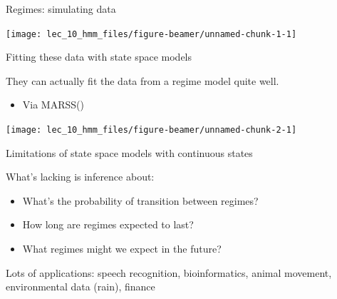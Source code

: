 \documentclass[
  ignorenonframetext,
]{beamer}
\providecommand{\tightlist}{%
  \setlength{\itemsep}{0pt}\setlength{\parskip}{0pt}}
\begin{document}
\begin{frame}{Regimes: simulating data}
\protect\hypertarget{regimes-simulating-data}{}

\begin{center}\texttt{[image: lec\_10\_hmm\_files/figure-beamer/unnamed-chunk-1-1]} \end{center}

\end{frame}

\begin{frame}{Fitting these data with state space models}
\protect\hypertarget{fitting-these-data-with-state-space-models}{}

They can actually fit the data from a regime model quite well.

\begin{itemize}
\tightlist
\item
  Via MARSS()
\end{itemize}

\begin{center}\texttt{[image: lec\_10\_hmm\_files/figure-beamer/unnamed-chunk-2-1]} \end{center}

\end{frame}

\begin{frame}{Limitations of state space models with continuous states}
\protect\hypertarget{limitations-of-state-space-models-with-continuous-states}{}

What's lacking is inference about:

\begin{itemize}
\tightlist
\item
  What's the probability of transition between regimes?
\item
  How long are regimes expected to last?
\item
  What regimes might we expect in the future?
\end{itemize}

Lots of applications: speech recognition, bioinformatics, animal
movement, environmental data (rain), finance

\end{frame}
\end{document}
